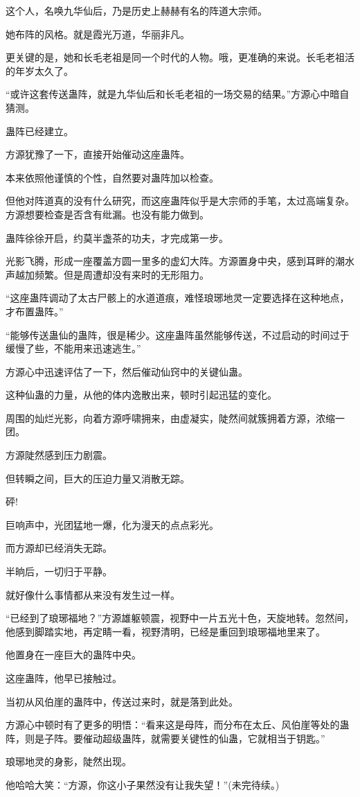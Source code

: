 \begin{this_body}
这个人，名唤九华仙后，乃是历史上赫赫有名的阵道大宗师。

她布阵的风格。就是霞光万道，华丽非凡。

更关键的是，她和长毛老祖是同一个时代的人物。哦，更准确的来说。长毛老祖活的年岁太久了。

“或许这套传送蛊阵，就是九华仙后和长毛老祖的一场交易的结果。”方源心中暗自猜测。

蛊阵已经建立。

方源犹豫了一下，直接开始催动这座蛊阵。

本来依照他谨慎的个性，自然要对蛊阵加以检查。

但他对阵道真的没有什么研究，而这座蛊阵似乎是大宗师的手笔，太过高端复杂。方源想要检查是否含有纰漏。也没有能力做到。

蛊阵徐徐开启，约莫半盏茶的功夫，才完成第一步。

光影飞腾，形成一座覆盖方圆一里多的虚幻大阵。方源置身中央，感到耳畔的潮水声越加频繁。但是周遭却没有来时的无形阻力。

“这座蛊阵调动了太古尸骸上的水道道痕，难怪琅琊地灵一定要选择在这种地点，才布置蛊阵。”

“能够传送蛊仙的蛊阵，很是稀少。这座蛊阵虽然能够传送，不过启动的时间过于缓慢了些，不能用来迅速逃生。”

方源心中迅速评估了一下，然后催动仙窍中的关键仙蛊。

这种仙蛊的力量，从他的体内逸散出来，顿时引起迅猛的变化。

周围的灿烂光影，向着方源呼啸拥来，由虚凝实，陡然间就簇拥着方源，浓缩一团。

方源陡然感到压力剧震。

但转瞬之间，巨大的压迫力量又消散无踪。

砰!

巨响声中，光团猛地一爆，化为漫天的点点彩光。

而方源却已经消失无踪。

半晌后，一切归于平静。

就好像什么事情都从来没有发生过一样。

“已经到了琅琊福地？”方源雄躯顿震，视野中一片五光十色，天旋地转。忽然间，他感到脚踏实地，再定睛一看，视野清明，已经是重回到琅琊福地里来了。

他置身在一座巨大的蛊阵中央。

这座蛊阵，他早已接触过。

当初从风伯崖的蛊阵中，传送过来时，就是落到此处。

方源心中顿时有了更多的明悟：“看来这是母阵，而分布在太丘、风伯崖等处的蛊阵，则是子阵。要催动超级蛊阵，就需要关键性的仙蛊，它就相当于钥匙。”

琅琊地灵的身影，陡然出现。

他哈哈大笑：“方源，你这小子果然没有让我失望！”(未完待续。)

\end{this_body}

